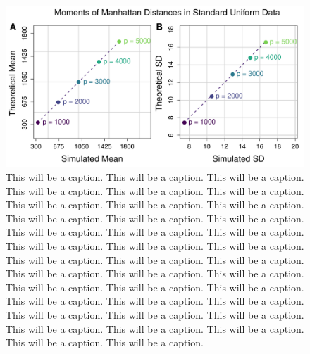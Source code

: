 \documentclass[10pt,letterpaper]{article}\usepackage[]{graphicx}\usepackage[]{color}
\begin{document}
\begin{figure}[H]
	\includegraphics[width=\textwidth]{compared_moments_uniform_manhattan_standard.pdf}
	\caption{This will be a caption. This will be a caption. This will be a caption. This will be a caption. This will be a caption. This will be a caption. This will be a caption. This will be a caption. This will be a caption. This will be a caption. This will be a caption. This will be a caption. This will be a caption. This will be a caption. This will be a caption. This will be a caption. This will be a caption. This will be a caption. This will be a caption. This will be a caption. This will be a caption. This will be a caption. This will be a caption. This will be a caption. This will be a caption. This will be a caption. This will be a caption. This will be a caption. This will be a caption. This will be a caption. This will be a caption. This will be a caption. This will be a caption. This will be a caption. This will be a caption. This will be a caption. This will be a caption. This will be a caption.}
\end{figure}
\end{document}
